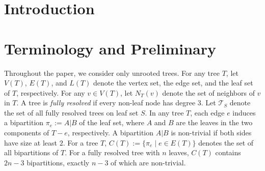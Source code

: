 \documentclass{bmcart}
\begin{document}


\section{Introduction}







\section{Terminology and Preliminary}\label{sec:prelim}

Throughout the paper, we consider only unrooted trees. For any tree $T$, let $V(T)$, $E(T)$, and $L(T)$ denote the vertex set, the edge set, and the leaf set of $T$, respectively. For any $v\in V(T)$, let $N_T(v)$ denote the set of neighbors of $v$ in $T$. A tree is \textit{fully resolved} if every non-leaf node has degree $3$. Let $\mathcal{T}_S$ denote the set of all fully resolved trees on leaf set $S$. In any tree $T$, each edge $e$ induces a bipartition $\pi_e := A|B$ of the leaf set, where $A$ and $B$ are the leaves in the two components of $T-e$, respectively. A bipartition $A|B$ is non-trivial if both sides have size at least $2$. For a tree $T$, $C(T) := \{\pi_e \mid e\in E(T)\}$ denotes the set of all bipartitions of $T$. For a fully resolved tree with $n$ leaves, $C(T)$ contains $2n-3$ bipartitions, exactly $n-3$ of which are non-trivial. \\
\end{document}
